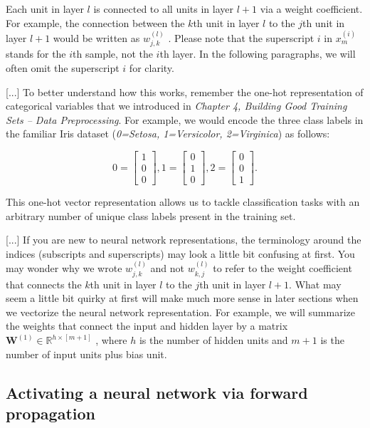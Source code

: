 \documentclass[letterpaper]{report}
\begin{document}
Each unit in layer $l$ is connected to all units in layer $l +1$ via a weight coefficient. For example, the connection between the $k$th unit in layer $l$ to the $j$th unit in layer
$l+1$ would be written as $w^{(l)}_{j, k}$ . Please note that the superscript $i$ in $x^{(i)}_{m}$ stands for the $i$th sample, not the $i$th layer. In the following paragraphs, we will often omit the superscript $i$ for clarity.

[...] To better understand how this works, remember the one-hot representation of categorical variables that we introduced in \textit{Chapter 4, Building Good Training Sets -- Data Preprocessing}. For example, we would encode the three class labels in the familiar Iris dataset (\textit{0=Setosa, 1=Versicolor, 2=Virginica})
as follows:

\[
0 =
\begin{bmatrix}
1 \\
0 \\
0
\end{bmatrix},
1 =
\begin{bmatrix}
0 \\
1 \\
0
\end{bmatrix},
2 =
\begin{bmatrix}
0 \\
0 \\
1
\end{bmatrix}.
\]

This one-hot vector representation allows us to tackle classification tasks with an arbitrary number of unique class labels present in the training set.


[...] If you are new to neural network representations, the terminology around the indices (subscripts and superscripts) may look a little bit confusing at  first. You may wonder
 why we wrote $w^{(l)}_{j, k}$ and not $w^{(l)}_{k, j}$ to refer to the weight coefficient that connects the $k$th unit in layer $l$ to the $j$th unit in layer $l +1$. What may seem a little bit quirky at first will make much more sense in later sections when we vectorize the neural network representation. For example, we will summarize the weights that connect the input and hidden layer by a matrix $\mathbf{W}^{(1)} \in \mathbb{R}^{h \times [m+1]}$ , where $h$ is the number of hidden units and $m + 1$ is the number of input units plus bias unit. 

\subsection{Activating a neural network via forward propagation}
\end{document}
